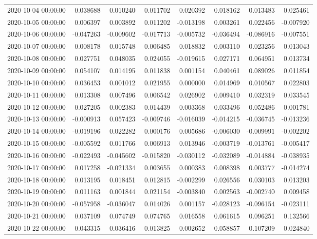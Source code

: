 \begin{tabular}{lrrrrrrr}
2020-10-04 00:00:00 & 0.038688 & 0.010240 & 0.011702 & 0.020392 & 0.018162 & 0.013483 & 0.025461 \\
2020-10-05 00:00:00 & 0.006397 & 0.003892 & 0.011202 & -0.013198 & 0.003261 & 0.022456 & -0.007920 \\
2020-10-06 00:00:00 & -0.047263 & -0.009602 & -0.017713 & -0.005732 & -0.036494 & -0.086916 & -0.007551 \\
2020-10-07 00:00:00 & 0.008178 & 0.015748 & 0.006485 & 0.018832 & 0.003110 & 0.023256 & 0.013043 \\
2020-10-08 00:00:00 & 0.027751 & 0.048035 & 0.024055 & -0.019615 & 0.027171 & 0.064951 & 0.013734 \\
2020-10-09 00:00:00 & 0.054107 & 0.014195 & 0.011838 & 0.001154 & 0.040461 & 0.089026 & 0.011854 \\
2020-10-10 00:00:00 & 0.036453 & 0.001012 & 0.021955 & 0.000000 & 0.014969 & 0.010567 & 0.022803 \\
2020-10-11 00:00:00 & 0.013308 & 0.007496 & 0.006542 & 0.026902 & 0.009410 & 0.032319 & 0.033545 \\
2020-10-12 00:00:00 & 0.027205 & 0.002383 & 0.014439 & 0.003368 & 0.033496 & 0.052486 & 0.001781 \\
2020-10-13 00:00:00 & -0.000913 & 0.057423 & -0.009746 & -0.016039 & -0.014215 & -0.036745 & -0.013236 \\
2020-10-14 00:00:00 & -0.019196 & 0.022282 & 0.000176 & 0.005686 & -0.006030 & -0.009991 & -0.002202 \\
2020-10-15 00:00:00 & -0.005592 & 0.011766 & 0.006913 & 0.013946 & -0.003719 & -0.013761 & -0.005417 \\
2020-10-16 00:00:00 & -0.022493 & -0.045602 & -0.015820 & -0.030112 & -0.032089 & -0.014884 & -0.038935 \\
2020-10-17 00:00:00 & 0.017258 & -0.021334 & 0.003655 & 0.000383 & 0.008398 & 0.003777 & -0.014274 \\
2020-10-18 00:00:00 & 0.013195 & 0.018451 & 0.012815 & -0.002299 & 0.026556 & 0.030103 & 0.013203 \\
2020-10-19 00:00:00 & 0.011163 & 0.001844 & 0.021154 & -0.003840 & 0.002563 & -0.002740 & 0.009458 \\
2020-10-20 00:00:00 & -0.057958 & -0.036047 & 0.014026 & 0.001157 & -0.028123 & -0.096154 & -0.023111 \\
2020-10-21 00:00:00 & 0.037109 & 0.074749 & 0.074765 & 0.016558 & 0.061615 & 0.096251 & 0.132566 \\
2020-10-22 00:00:00 & 0.043315 & 0.036416 & 0.013825 & 0.002652 & 0.058857 & 0.107209 & 0.024840 \\

\end{tabular}
